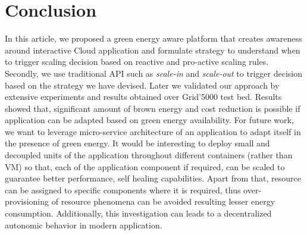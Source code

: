 \section{Conclusion}

In this article, we proposed a green energy aware platform that creates awareness around interactive Cloud application and formulate strategy to understand when to trigger scaling decision based on reactive and pro-active scaling rules. Secondly, we use traditional API such as \emph{scale-in} and \emph{scale-out} to trigger decision based on the strategy we have devised. Later we validated our approach by extensive experiments and results obtained over Grid'5000 test bed. Results showed that, significant amount of brown energy and cost reduction is possible if application can be adapted based on green energy availability.
For future work, we want to leverage micro-service architecture of an application to adapt itself in the presence of green energy. It would be interesting to deploy small and decoupled units of the application
throughout different containers (rather than VM) so that, each of the application component if required, can be scaled to guarantee better performance, self healing capabilities. Apart from that, resource can be assigned to specific components where it is required, thus over-provisioning of resource phenomena can be avoided resulting lesser energy consumption. Additionally, this investigation can leads to a decentralized autonomic behavior in modern
application. 

